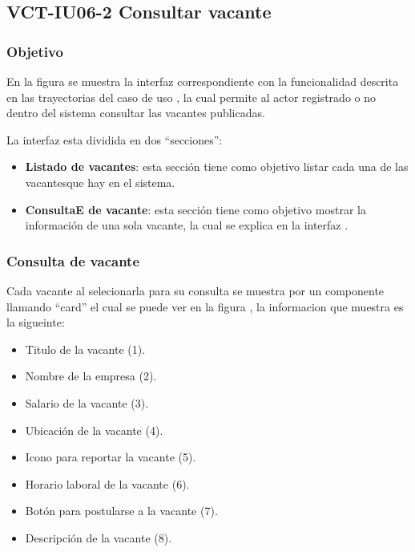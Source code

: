 \clearpage
\subsection{VCT-IU06-2 Consultar vacante}

\subsubsection{Objetivo}
En la figura  se muestra la interfaz correspondiente con la funcionalidad descrita en las
trayectorias del caso de uso  , la cual permite al actor registrado o no dentro del sistema consultar 
las vacantes publicadas.

La interfaz esta dividida en dos ``secciones'':
\begin{itemize}
   \item \textbf{Listado de vacantes}: esta sección tiene como objetivo listar cada una de las vacantesque hay en el sistema.
   \item \textbf{ConsultaE de vacante}: esta sección tiene como objetivo mostrar la información de una sola vacante, la cual se explica en 
   la interfaz .
\end{itemize}


\subsubsection{Consulta de vacante}
Cada vacante al selecionarla para su consulta se muestra por un componente llamando ``card'' el cual se puede ver en la figura , la informacion que 
muestra es la sigueinte: 
\begin{itemize}
   \item Titulo de la vacante (1).
   \item Nombre de la empresa (2).
   \item Salario de la vacante (3).
   \item Ubicación de la vacante (4).
   \item Icono para reportar la vacante (5).
   \item Horario laboral de la vacante (6).
   \item Botón para postularse a la vacante (7).
   \item Descripción de la vacante (8).
\end{itemize}




\clearpage
